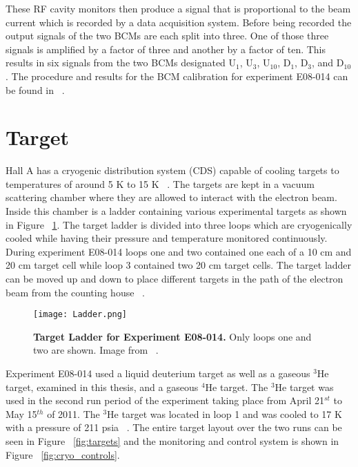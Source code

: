 These RF cavity monitors then produce a signal that is proportional to the beam current which is recorded by a data acquisition system. Before being recorded the output signals of the two BCMs are each split into three. One of those three signals is amplified by a factor of three and another by a factor of ten. This results in six signals from the two BCMs designated U$_1$, U$_3$, U$_{10}$, D$_1$, D$_3$, and D$_{10}$. The procedure and results for the BCM calibration for experiment E08-014 can be found in ~\cite{bcm_calibration}. 

\section{Target}
\label{sec:target}

Hall A has a cryogenic distribution system (CDS) capable of cooling targets to temperatures of around 5 K to 15 K ~\cite{Article:HallA}. The targets are kept in a vacuum scattering chamber where they are allowed to interact with the electron beam. Inside this chamber is a ladder containing various experimental targets as shown in Figure ~\ref{fig:ladder}. The target ladder is divided into three loops which are cryogenically cooled while having their pressure and temperature monitored continuously. During experiment E08-014 loops one and two contained one each of a 10 cm and 20 cm target cell while loop 3 contained two 20 cm target cells. The target ladder can be moved up and down to place different targets in the path of the electron beam from the counting house ~\cite{Thesis:Ye}.  

\begin{figure}[!ht]
\begin{center}
\texttt{[image: Ladder.png]}
\end{center}
\caption[Target Ladder for Experiment E08-014]{
{\bf{Target Ladder for Experiment E08-014.}} Only loops one and two are shown. Image from ~\cite{Thesis:Ye}.}
\label{fig:ladder}
\end{figure}

Experiment E08-014 used a liquid deuterium target as well as a gaseous $^3$He target, examined in this thesis, and a gaseous $^4$He target. The $^3$He target was used in the second run period of the experiment taking place from April 21$^{st}$ to May 15$^{th}$ of 2011. The $^3$He target was located in loop 1 and was cooled to 17 K with a pressure of 211 psia ~\cite{Thesis:Ye}. The entire target layout over the two runs can be seen in Figure ~\ref{fig:targets} and the monitoring and control system is shown in Figure ~\ref{fig:cryo_controls}.


